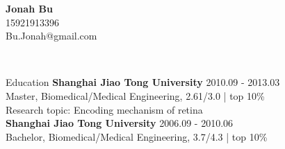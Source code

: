 \documentclass{resume} %
\begin{document}
\vspace{-60pt}
\begin{center}
	\textbf{Jonah Bu} \\
	15921913396 \quad \\ \quad Bu.Jonah@gmail.com
\end{center}

\
\begin{rSection}{Education}
{\bf Shanghai Jiao Tong University} \hfill {2010.09 - 2013.03} \\ 
Master, Biomedical/Medical Engineering, 2.61/3.0 | top 10\% \\
Research topic: Encoding mechanism of retina\\

\vspace{-10pt}
{\bf Shanghai Jiao Tong University} \hfill {2006.09 - 2010.06} \\ 
Bachelor, Biomedical/Medical Engineering, 3.7/4.3 | top 10\% \\

\end{rSection}
\end{document}
